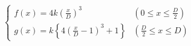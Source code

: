 \documentclass[
  11pt,
  border=2,
  convert={
    density=100 -alpha remove,
    outext=.png
  },
]{standalone}
\begin{document}
$
  \begin{cases}
    \displaystyle f(x) = 4k\left(\frac{x}{D}\right)^{3}
      & \left(0 \leq x \leq \frac{D}{2}\right)
    \\
    \displaystyle g(x) = k\left\{4\left(\frac{x}{D} - 1\right)^{3} + 1\right\}
      & \left(\frac{D}{2} \leq x \leq D\right)
  \end{cases}
$
\end{document}
